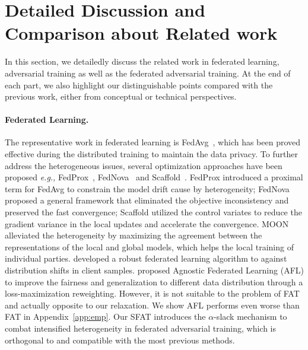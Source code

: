 \documentclass{article} %
\theoremstyle{plain}
\theoremstyle{definition}
\theoremstyle{remark}
\begin{document}


\section{Detailed Discussion and Comparison about Related work}
\label{app:related_work}

In this section, we detailedly discuss the related work in federated learning, adversarial training as well as the federated adversarial training. At the end of each part, we also highlight our distinguishable points compared with the previous work, either from conceptual or technical perspectives.

\paragraph{Federated Learning.}
The representative work in federated learning is FedAvg~\citep{mcmahan2017communication}, which has been proved effective during the distributed training to maintain the data privacy. To further address the heterogeneous issues, several optimization approaches have been proposed \textit{\textit{e.g.,}} FedProx~\citep{li2018federated}, FedNova~\citep{wang2020tackling} and Scaffold~\citep{karimireddy2020scaffold}. FedProx introduced a proximal term for FedAvg to constrain the model drift cause by heterogeneity; FedNova proposed a general framework that eliminated the objective inconsistency and preserved the fast convergence; Scaffold utilized the control variates to reduce the gradient variance in the local updates and accelerate the convergence. MOON~\citep{Li_2021_CVPR} alleviated the heterogeneity by maximizing the agreement between the representations of the local and global models, which helps the local training of individual parties. 
\citet{reisizadeh2020robust} developed a robust federated learning algorithm to against distribution shifts in client samples.
\citet{mohri2019agnostic} proposed Agnostic Federated Learning (AFL) to improve the fairness and generalization to different data distribution through a loss-maximization reweighting. However, it is not suitable to the problem of FAT and actually opposite to our relaxation. We show AFL performs even worse than FAT in Appendix~\ref{app:emp}. Our SFAT introduces the $\alpha$-slack mechanism to combat intensified heterogeneity in federated adversarial training, which is orthogonal to and compatible with the most previous methods. 
\end{document}

